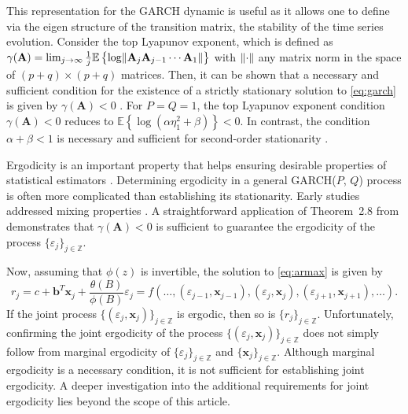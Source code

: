 \documentclass[10pt,a4paper,oneside]{article}
\newcommand{\Z}{\mathbb{Z}}
\newcommand{\E}{\mathbb{E}}
\DeclarePairedDelimiter{\norma}{\lVert}{\rVert} %
\begin{document}
 This representation for the GARCH dynamic is useful as it allows one to define via the eigen structure of the transition matrix, the stability of the time series evolution. Consider the top Lyapunov exponent, which is defined as $\gamma(\mathbf{A}) = \lim_{j \rightarrow \infty} \frac{1}{j} \E \left \{  \log\norma{\mathbf{A}_j \mathbf{A}_{j - 1} \cdots \mathbf{A}_1} \right \}$ with $\norma{\cdot}$ any matrix norm in the space of $(p + q) \times (p + q)$ matrices. Then, it can be shown that a necessary and sufficient condition for the existence of a strictly stationary solution to \eqref{eq:garch} is given by $\gamma(\mathbf{A}) < 0$ \citep[thm.~2.4.]{francq2019garch}. For $P = Q = 1$, the top Lyapunov exponent condition $\gamma(\mathbf{A}) < 0$ reduces to $\E \left\{ \log \left( \alpha \eta_1^2 + \beta \right) \right\} < 0$. In contrast, the condition $\alpha + \beta < 1$ is necessary and sufficient for second-order stationarity \citep[thm.~2.5.]{francq2019garch}.

Ergodicity is an important property that helps ensuring desirable properties of statistical estimators \citep[see~p.~367]{francq2019garch}. Determining ergodicity in a general GARCH(\(P\), \(Q\)) process is often more complicated than establishing its stationarity. Early studies addressed mixing properties \cite{boussama1998ergodicite, carrasco2002mixing}. A straightforward application of Theorem~2.8 from \cite{straumann_quasi-maximum-likelihood_2006} demonstrates that \(\gamma(\mathbf{A}) < 0\) is sufficient to guarantee the ergodicity of the process \(\{\varepsilon_j\}_{j \in \mathbb{Z}}\).

Now, assuming that $\phi(z)$ is invertible, the solution to \eqref{eq:armax} is given by
$$
    r_j = c +  \mathbf{b}^T \mathbf{x}_j + \frac{\theta(B)}{\phi(B)} \varepsilon_j = f(\dots, (\varepsilon_{j - 1}, \mathbf{x}_{j - 1}), (\varepsilon_{j}, \mathbf{x}_{j}), (\varepsilon_{j + 1}, \mathbf{x}_{j + 1}), \dots).
$$
If the joint process $\{ (\varepsilon_j, \mathbf{x}_j) \}_{j \in \Z}$ is ergodic, then so is $\{ r_j \}_{j \in \Z}$. Unfortunately, confirming the joint ergodicity of the process \(\{(\varepsilon_j, \mathbf{x}_j)\}_{j \in \mathbb{Z}}\) does not simply follow from marginal ergodicity of \(\{\varepsilon_j\}_{j \in \mathbb{Z}}\) and \(\{\mathbf{x}_j\}_{j \in \mathbb{Z}}\). Although marginal ergodicity is a necessary condition, it is not sufficient for establishing joint ergodicity. A deeper investigation into the additional requirements for joint ergodicity lies beyond the scope of this article.
\end{document}
